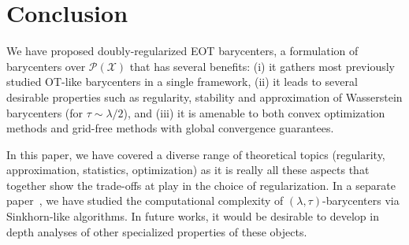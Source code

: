 \documentclass[11pt]{article}
\newcommand{\Pp}{\mathcal{P}}
\newcommand{\Xx}{\mathcal{X}}
\begin{document}
\section{Conclusion}
We have proposed doubly-regularized EOT barycenters, a formulation of barycenters over $\Pp(\Xx)$ that has several benefits: (i) it gathers most previously studied OT-like barycenters in a single framework, (ii) it leads to several desirable properties such as regularity, stability and approximation of Wasserstein barycenters (for $\tau\sim \lambda/2$), and (iii) it is amenable to both convex optimization methods and grid-free methods with global convergence guarantees. 

In this paper, we have covered a diverse range of theoretical topics (regularity, approximation, statistics, optimization) as it is really all these aspects that together show the trade-offs at play in the choice of regularization. In a separate paper~\cite{vavskevivcius2023computational}, we have studied the computational complexity of $(\lambda,\tau)$-barycenters via Sinkhorn-like algorithms. In future works, it would be desirable to develop in depth analyses of other specialized properties of these objects.





%
%
\printbibliography
\appendix
\end{document}
